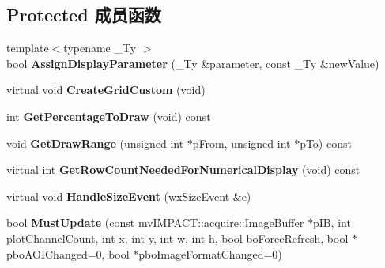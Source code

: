 \subsection*{Protected 成员函数}
\begin{DoxyCompactItemize}
\item 
\hypertarget{class_plot_canvas_image_analysis_aefb4e2a4fa18e4a66b6aba0f527478dd}{{\footnotesize template$<$typename \+\_\+\+Ty $>$ }\\bool {\bfseries Assign\+Display\+Parameter} (\+\_\+\+Ty \&parameter, const \+\_\+\+Ty \&new\+Value)}\label{class_plot_canvas_image_analysis_aefb4e2a4fa18e4a66b6aba0f527478dd}

\item 
\hypertarget{class_plot_canvas_image_analysis_adeb883c037f8c92454ce9300edb70530}{virtual void {\bfseries Create\+Grid\+Custom} (void)}\label{class_plot_canvas_image_analysis_adeb883c037f8c92454ce9300edb70530}

\item 
\hypertarget{class_plot_canvas_image_analysis_a406fd13bbd154e8fc6b5290072ed271a}{int {\bfseries Get\+Percentage\+To\+Draw} (void) const }\label{class_plot_canvas_image_analysis_a406fd13bbd154e8fc6b5290072ed271a}

\item 
\hypertarget{class_plot_canvas_image_analysis_af4675e96cb818c159974152f981da583}{void {\bfseries Get\+Draw\+Range} (unsigned int $\ast$p\+From, unsigned int $\ast$p\+To) const }\label{class_plot_canvas_image_analysis_af4675e96cb818c159974152f981da583}

\item 
\hypertarget{class_plot_canvas_image_analysis_a62e4e4b402b84ebc14f6b66afb9c243d}{virtual int {\bfseries Get\+Row\+Count\+Needed\+For\+Numerical\+Display} (void) const }\label{class_plot_canvas_image_analysis_a62e4e4b402b84ebc14f6b66afb9c243d}

\item 
\hypertarget{class_plot_canvas_image_analysis_aa770147d8a90fe155ed384e0df56fe3a}{virtual void {\bfseries Handle\+Size\+Event} (wx\+Size\+Event \&e)}\label{class_plot_canvas_image_analysis_aa770147d8a90fe155ed384e0df56fe3a}

\item 
\hypertarget{class_plot_canvas_image_analysis_a4a802b5180ce2c13c9bee1b81e65a3a2}{bool {\bfseries Must\+Update} (const mv\+I\+M\+P\+A\+C\+T\+::acquire\+::\+Image\+Buffer $\ast$p\+I\+B, int plot\+Channel\+Count, int x, int y, int w, int h, bool bo\+Force\+Refresh, bool $\ast$pbo\+A\+O\+I\+Changed=0, bool $\ast$pbo\+Image\+Format\+Changed=0)}\label{class_plot_canvas_image_analysis_a4a802b5180ce2c13c9bee1b81e65a3a2}


\end{DoxyCompactItemize}
